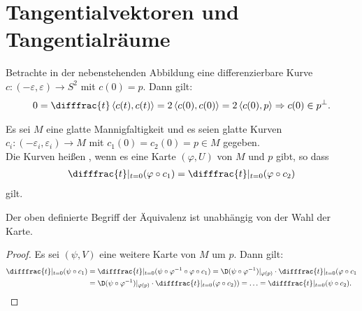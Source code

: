 
\section{Tangentialvektoren und Tangentialräume}


Betrachte in der nebenstehenden Abbildung eine differenzierbare Kurve $c \colon (-\varepsilon,\varepsilon) \to S^2$ mit $c(0) = p$. Dann gilt:
\begin{align*}
  0 = \difffrac{t} \left<c(t),c(t)\right> = 2\left<c(0),c(0)\right> = 2 \left<c(0),p\right> 
  \Rightarrow c(0) \in p^{\perp}.
\end{align*}


Es sei $M$ eine glatte Mannigfaltigkeit und es seien glatte Kurven $c_i\colon (-\varepsilon_i,\varepsilon_i) \to M$ mit $c_1(0) = c_2(0) = p \in M$ gegeben.\\

Die Kurven heißen , wenn es eine Karte $(\varphi,U)$ von $M$ und $p$ gibt, so dass 
\begin{align*}
  \difffrac{t}|_{t=0}(\varphi \circ c_1) = \difffrac{t}|_{t=0}(\varphi \circ c_2)
\end{align*}
gilt.

\begin{lemma}
  Der oben definierte Begriff der Äquivalenz ist unabhängig von der Wahl der Karte.
\end{lemma}

\begin{proof}
  Es sei $(\psi,V)$ eine weitere Karte von $M$ um $p$. Dann gilt:
  \begin{align*}
    \difffrac{t}|_{t=0}(\psi\circ c_1) & = \difffrac{t}|_{t=0}(\psi\circ\varphi^{-1}\circ\varphi \circ c_1) = \D (\psi \circ \varphi^{-1})|_{\varphi(p)} \cdot \difffrac{t}|_{t=0}(\varphi \circ c_1\\
    & = \D(\psi \circ \varphi^{-1})|_{\varphi(p)} \cdot \difffrac{t}|_{t=0}(\varphi \circ c_2) ) = \ldots = \difffrac{t}|_{t=0}(\psi \circ c_2).
  \end{align*}
\end{proof}

